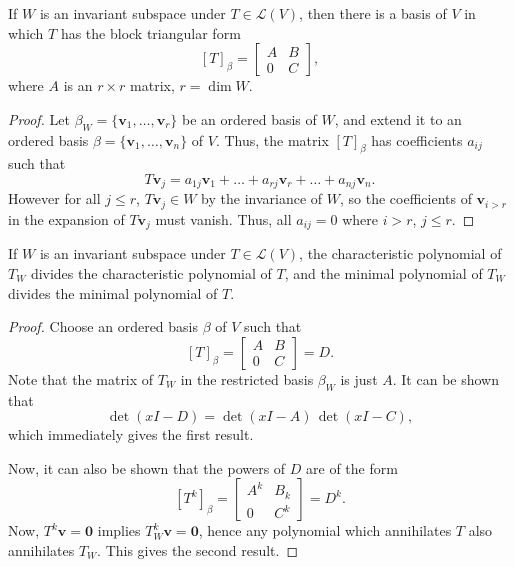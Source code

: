 \documentclass[11pt]{article}
\renewcommand{\vec}[1]{\boldsymbol{#1}}
\newcommand{\vv}{\vec{v}}
\newcommand{\alg}[1]{\mathscr{#1}}
\newcommand{\algL}{\alg{L}}
\newcommand{\dim}{\operatorname{dim}}
\theoremstyle{definition}
\theoremstyle{remark}
\numberwithin{equation}{section}
\begin{document}
    \begin{lemma}
        If $W$ is an invariant subspace under $T \in \algL(V)$, then there is a basis of
        $V$ in which $T$ has the block triangular form \[
            [T]_\beta = \begin{bmatrix}
                A & B \\ 0 & C
            \end{bmatrix},
        \] where $A$ is an $r \times r$ matrix, $r = \dim{W}$.
    \end{lemma}
    \begin{proof}
        Let $\beta_W = \{\vv_1, \dots, \vv_r\}$ be an ordered basis of $W$, and
        extend it to an ordered basis $\beta = \{\vv_1, \dots, \vv_n\}$ of $V$. Thus,
        the matrix $[T]_\beta$ has coefficients $a_{ij}$ such that \[
            T\vv_j = a_{1j}\vv_1 + \dots  + a_{rj}\vv_r + \dots + a_{nj}\vv_n.
        \] However for all $j \leq r$, $T\vv_j \in W$ by the invariance of $W$, so
        the coefficients of $\vv_{i > r}$ in the expansion of $T\vv_j$ must vanish.
        Thus, all $a_{ij} = 0$ where $i > r$, $j \leq r$.
    \end{proof}

    \begin{lemma}
        If $W$ is an invariant subspace under $T \in \algL(V)$, the characteristic
        polynomial of $T_W$ divides the characteristic polynomial of $T$, and the
        minimal polynomial of $T_W$ divides the minimal polynomial of $T$.
    \end{lemma}
    \begin{proof}
        Choose an ordered basis $\beta$ of $V$ such that \[
            [T]_\beta = \begin{bmatrix}
                A & B \\ 0 & C
            \end{bmatrix} = D.
        \] Note that the matrix of $T_W$ in the restricted basis $\beta_W$ is just
        $A$. It can be shown that \[
            \det(xI - D) = \det(xI - A)\,\det(xI - C),
        \] which immediately gives the first result.

        Now, it can also be shown that the powers of $D$ are of the form \[
            [T^k]_\beta = \begin{bmatrix}
                A^k & B_k \\ 0 & C^k
            \end{bmatrix} = D^k.
        \] Now, $T^k\vv = \vec{0}$ implies $T_W^k\vv = \vec{0}$, hence any
        polynomial which annihilates $T$ also annihilates $T_W$. This gives the
        second result.
    \end{proof}
\end{document}
